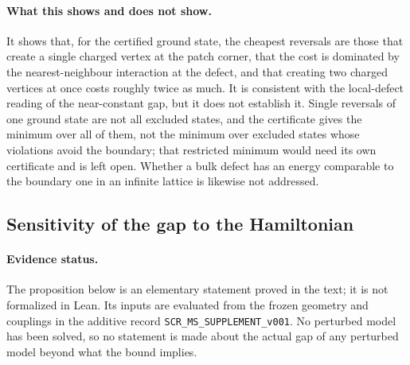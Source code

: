 \documentclass[11pt,a4paper]{article}
\theoremstyle{plain}
\theoremstyle{definition}
\theoremstyle{remark}
\newcommand{\lean}[1]{\nolinkurl{#1}}
\begin{document}
\paragraph{What this shows and does not show.} It shows that, for the certified ground state, the cheapest reversals are those that create a single charged vertex at the patch corner, that the cost is dominated by the nearest-neighbour interaction at the defect, and that creating two charged vertices at once costs roughly twice as much. It is consistent with the local-defect reading of the near-constant gap, but it does not establish it. Single reversals of one ground state are not all excluded states, and the certificate gives the minimum over all of them, not the minimum over excluded states whose violations avoid the boundary; that restricted minimum would need its own certificate and is left open. Whether a bulk defect has an energy comparable to the boundary one in an infinite lattice is likewise not addressed.

\subsection{Sensitivity of the gap to the Hamiltonian}\label{sec:sensitivity}
\paragraph{Evidence status.} The proposition below is an elementary statement proved in the text; it is not formalized in Lean. Its inputs are evaluated from the frozen geometry and couplings in the additive record \lean{SCR_MS_SUPPLEMENT_v001}. No perturbed model has been solved, so no statement is made about the actual gap of any perturbed model beyond what the bound implies.
\end{document}
